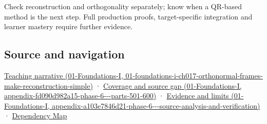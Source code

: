 Check reconstruction and orthogonality separately; know when a QR-based method is the next step. Full production proofs, target-specific integration and learner mastery require further evidence.

\subsection{Source and navigation}\label{appendix-c39f1ed34271-source-and-navigation}

\href{../01-Foundations-I/main.pdf\#nameddest=01-foundations-i-ch017-orthonormal-frames-make-reconstruction-simple}{Teaching narrative (01-Foundations-I, 01-foundations-i-ch017-orthonormal-frames-make-reconstruction-simple)} · \href{../01-Foundations-I/main.pdf\#nameddest=appendix-fd090d982a15-phase-6---parts-501-600}{Coverage and source gap (01-Foundations-I, appendix-fd090d982a15-phase-6-\/-\/-parts-501-600)} · \href{../01-Foundations-I/main.pdf\#nameddest=appendix-a103e7846d21-phase-6---source-analysis-and-verification}{Evidence and limits (01-Foundations-I, appendix-a103e7846d21-phase-6-\/-\/-source-analysis-and-verification)} · \hyperref[appendix-4ad47bdd269a]{Dependency Map}
